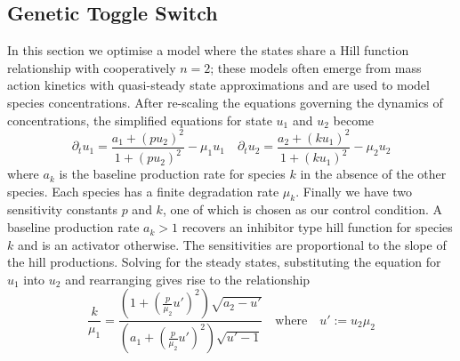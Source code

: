 \documentclass{article}
\begin{document}
\subsection{Genetic Toggle Switch}
In this section we optimise a model where the states share a Hill function relationship with cooperatively $n=2$; these models often emerge from mass action kinetics with quasi-steady state approximations and are used to model species concentrations. After re-scaling the equations governing the dynamics of concentrations, the simplified equations for state $u_1$ and $u_2$ become 
\begin{equation}
    \partial_t u_1 = \frac{ a_1 + (p u_2)^2}{ 1 + (p u_2)^2 } - \mu_1 u_1 \quad
    \partial_t u_2 = \frac{ a_2 + (k u_1)^2}{ 1 + (k u_1)^2 } - \mu_2 u_2
    \label{eq:two-state}
\end{equation}
where $a_k$ is the baseline production rate for species $k$ in the absence of the other species. Each species has a finite degradation rate $\mu_k$. Finally we have two sensitivity constants $p$ and $k$, one of which is chosen as our control condition. A baseline production rate $a_k>1$ recovers an inhibitor type hill function for species $k$ and is an activator otherwise. The sensitivities are proportional to the slope of the hill productions. Solving for the steady states,  substituting the equation for $u_1$ into $u_2$ and rearranging gives rise to the relationship
\begin{equation}
    \dfrac{k}{\mu_1} = \dfrac{(1 + (\frac{p}{\mu_2} u')^2) \sqrt{a_2 - u'} }{ (a_1 + (\frac{p}{\mu_2} u')^2) \sqrt{ u' - 1 } }
    \quad\mathrm{where}\quad u':= u_2\mu_2
    \label{eq:steady-states}
\end{equation}
\end{document}
